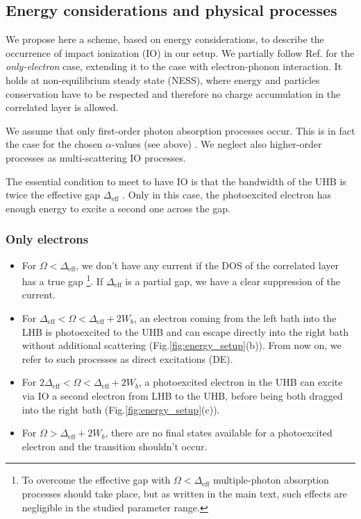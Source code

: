 \documentclass[aps,prb,groupedaddress,showpacs,twocolumn,superscriptaddress,10pt]{revtex4-2}
\begin{document}
\subsection{Energy considerations and physical processes}
\label{sec:explicative_scheme}

We propose here a scheme, based on energy considerations, to describe the occurrence of impact ionization (IO) in our setup. We partially follow Ref.\cite{so.do.18,ma.ev.22} for the \emph{only-electron} case, extending it to the case with electron-phonon interaction. It holds at non-equilibrium steady state (NESS), where energy and particles conservation have to be respected and therefore no charge accumulation in the correlated layer is allowed.   

We assume that only first-order photon absorption processes occur. This is in fact the case for the chosen $\alpha$-values (see above) \cite{so.do.18}. We neglect also higher-order processes as multi-scattering IO processes. 

The essential condition to meet to have IO is that the bandwidth of the UHB is twice the effective gap $\Delta_{\textrm{eff}}$ \cite{so.do.18}. Only in this case, the photoexcited electron has enough energy to excite a second one across the gap. 

\subsubsection{Only electrons}
\label{sec:scheme_only_electrons}  
 
\begin{itemize}

\item For $\Omega<\Delta_{\textrm{eff}}$, we don't have any current if the DOS of the correlated layer has a true gap \footnote{To overcome the effective gap with $\Omega<\Delta_{\textrm{eff}}$ multiple-photon absorption processes should take place, but as written in the main text, such effects are negligible in the studied parameter range.}. If $\Delta_{\textrm{eff}}$ is a partial gap, we have a clear suppression of the current.  
 
\item For $\Delta_{\textrm{eff}}<\Omega<\Delta_{\textrm{eff}}+2W_b$, an electron coming from the left bath into the LHB is photoexcited to the UHB and can escape directly into the right bath without additional scattering (Fig.\ref{fig:energy_setup}(b)). From now on, we refer to such processes as direct excitations (DE). 
 
                             
\item For $2\Delta_{\textrm{eff}}<\Omega<\Delta_{\textrm{eff}}+2W_b$, a photoexcited electron in the UHB can excite via IO a second electron from LHB to the UHB, before being both dragged into the right bath (Fig.\ref{fig:energy_setup}(c)).

\item For $\Omega>\Delta_{\textrm{eff}}+2W_b$, there are no final states available for a photoexcited electron and the transition shouldn't occur. 

\end{itemize} 
\end{document}
